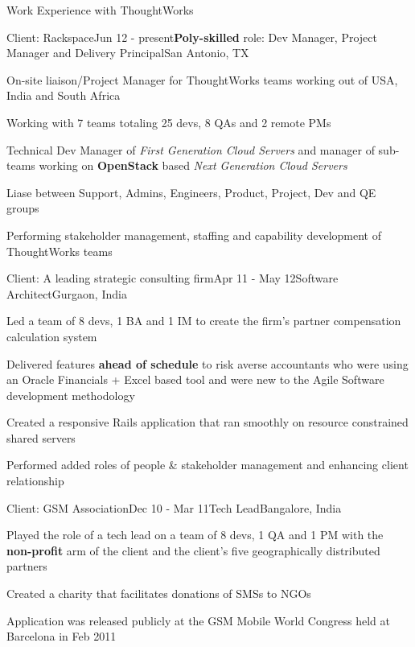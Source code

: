 \documentclass{resume} %
\begin{document}

\begin{rSection}{Work Experience with ThoughtWorks}

\begin{rSubsection}{Client: Rackspace}{Jun 12 - present}{\textbf{Poly-skilled} role: Dev Manager, Project Manager and Delivery Principal}{San Antonio, TX}
\item On-site liaison/Project Manager for ThoughtWorks teams working
  out of USA, India and South Africa
\item Working with 7 teams totaling 25 devs, 8 QAs and 2 remote PMs
\item Technical Dev Manager of {\em First Generation Cloud Servers}
  and manager of sub-teams working on {\bf OpenStack} based {\em Next Generation Cloud Servers}
\item Liase between Support, Admins, Engineers, Product, Project, Dev and QE groups
\item Performing stakeholder management, staffing and capability development of ThoughtWorks teams
\end{rSubsection}


\begin{rSubsection}{Client: A leading strategic consulting firm}{Apr 11 - May 12}{Software Architect}{Gurgaon, India}
\item Led a team of 8 devs, 1 BA and 1 IM to create the firm's partner compensation calculation system
\item Delivered features {\bf ahead of schedule} to risk averse accountants who were using an Oracle Financials + Excel based tool and were new to the Agile Software development methodology
\item Created a responsive Rails application that ran smoothly on resource constrained shared servers
\item Performed added roles of people \& stakeholder management and enhancing client relationship
\end{rSubsection}


\begin{rSubsection}{Client: GSM Association}{Dec 10 - Mar 11}{Tech Lead}{Bangalore, India}
\item Played the role of a tech lead on a team of 8 devs, 1 QA and 1
  PM with the {\bf non-profit} arm of the client and the client's five
  geographically distributed partners
\item Created a charity that facilitates donations of SMSs to NGOs
\item Application was released publicly at the GSM Mobile World Congress held at Barcelona in Feb 2011
\end{rSubsection}



\end{rSection}
\end{document}
